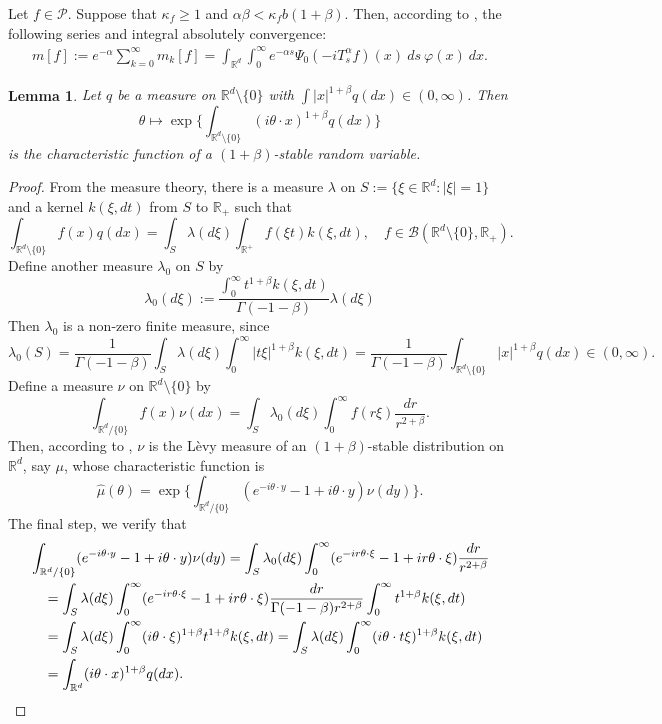 \documentclass[12pt,oneside,english]{amsart}
\theoremstyle{plain}
\newtheorem{lem}[thm]{Lemma}
\theoremstyle{definition}
\numberwithin{equation}{section}
\begin{document}
    Let $f\in \mathcal{P}$.
    Suppose that $\kappa_f\geq 1$ and $\alpha\beta<\kappa_fb(1+\beta)$. Then, according to \cite[Lemma 5.1]{MM}, the following series and integral absolutely convergence:
\begin{align}
    m[f]
    :=e^{-\alpha}\sum_{k=0}^\infty m_k[f]
    =\int_{\mathbb{R}^d}\int_0^{\infty} e^{-\alpha s}\Psi_0(-iT_{s}^{\alpha}f)(x)~ds~\varphi(x)~dx. \label{msmallcase}
\end{align}
\begin{lem}
\label{lem: charactreisticfunction}
    Let $q$ be a measure on $\mathbb R^d\setminus\{0\}$ with $\int |x|^{1+\beta} q(dx) \in (0,\infty)$.
    Then $$\theta \mapsto  \exp\Big\{\int_{\mathbb R^d\setminus\{0\}} (i\theta \cdot x)^{1+\beta} q(dx)\Big\}$$
    is the characteristic function of a $(1+\beta)$-stable random variable.
\end{lem}
\begin{proof}
    From the measure theory, there is a measure $\lambda$ on $S:= \{\xi\in \mathbb R^d:|\xi| = 1\}$ and a kernel $k(\xi,dt)$ from $S$ to $\mathbb R_+$ such that
\[
    \int_{\mathbb R^d\setminus \{0\}} f(x)q(dx) = \int_S \lambda(d\xi) \int_{\mathbb R^+} f(\xi t)k(\xi,dt),\quad
    f\in \mathcal B(\mathbb R^d\setminus \{0\}, \mathbb R_+).
\]
    Define another measure $\lambda_0$ on $S$ by
\[
    \lambda_0(d\xi) := \frac{\int_0^\infty t^{1+\beta}k(\xi,dt)}{\Gamma(-1-\beta)} \lambda (d\xi)
\]
    Then $\lambda_0$ is a non-zero finite measure, since
\[
    \lambda_0(S) = \frac{1}{\Gamma(-1-\beta)} \int_S \lambda (d\xi) \int_0^\infty |t\xi|^{1+\beta}k(\xi,dt)
    = \frac{1}{\Gamma(-1-\beta)} \int_{\mathbb R^d\setminus\{0\}} |x|^{1+\beta} q(dx) \in (0,\infty).
\]
    Define a measure $\nu$ on $\mathbb R^d\setminus\{0\}$ by
\[
    \int_{\mathbb R^d/\{0\}}f(x)\nu(dx)= \int_{S} \lambda_0(d\xi) \int_0^\infty f(r\xi) \frac{dr}{r^{2+\beta}} .
\]
    Then, according to \cite[Remark 14.4]{Sato1999Levy}, $\nu$ is the L\`evy measure of an $(1+\beta)$-stable distribution on $\mathbb R^d$, say $\mu$, whose characteristic function is \[\hat \mu(\theta)=\exp\Big\{\int_{\mathbb R^d/\{0\}} (e^{-i\theta \cdot y}-1+i\theta \cdot y) \nu(dy)\Big\}.\]
    The final step, we verify that
\begin{align}
    &\int_{\mathbb R^d/\{0\}} (e^{-i\theta \cdot y}-1+i\theta \cdot y) \nu(dy)
    = \int_S \lambda_0(d\xi) \int_0^\infty (e^{-ir\theta \cdot \xi}-1+ir\theta \cdot \xi) \frac{dr}{r^{2+\beta}}
\\&\quad = \int_S \lambda (d\xi) \int_0^\infty (e^{-ir\theta \cdot \xi}-1+ir\theta \cdot \xi) \frac{dr}{\Gamma(-1-\beta)r^{2+\beta}}\int_0^\infty t^{1+\beta} k(\xi,dt)
\\&\quad = \int_S \lambda (d\xi) \int_0^\infty (i\theta\cdot \xi)^{1+\beta} t^{1+\beta} k(\xi,dt)
= \int_S \lambda(d\xi) \int_0^\infty (i\theta \cdot t\xi)^{1+\beta} k(\xi,dt)
\\&\quad = \int_{\mathbb R^d} (i\theta \cdot x)^{1+\beta} q(dx).
\qedhere
\end{align}
\end{proof}
\end{document}
